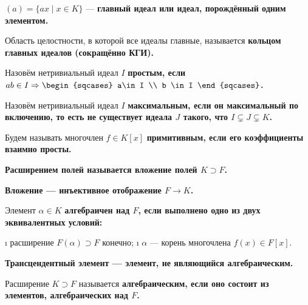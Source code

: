 \begin{defn}
\((a) = \{ax \mid x\in K\}\) --- \bf{главный идеал} или \bf{идеал, порождённый одним элементом}.
\end{defn}

\begin{defn}
Область целостности, в которой все идеалы главные, называется \bf{кольцом главных идеалов} (сокращённо КГИ).
\end{defn}

\begin{defn}
Назовём нетривиальный идеал \(I\) \bf{простым}, если \(ab \in I \Then \begin{sqcases} a\in I \\ b \in I \end{sqcases}\).
\end{defn}

\begin{defn}
Назовём нетривиальный идеал \(I\) \bf{максимальным}, если он максимальный по включению, то есть не существует идеала \(J\) такого, что \(I \subsetneq J \subsetneq K\).
\end{defn}

\begin{defn}
Будем называть многочлен \(f \in K[x]\) \bf{примитивным}, если его коэффициенты взаимно просты.
\end{defn}

\begin{defn}
\bf{Расширением полей} называется вложение полей \(K \supset F\).

\bf{Вложение} --- инъективное отображение \(F \to K\).
\end{defn}

\begin{defn}
Элемент \(\alpha \in K\) \bf{алгебраичен} над \(F\), если выполнено одно из двух эквивалентных условий:

\begin{enumerate}
\def\labelenumi{\arabic{enumi}.}
\tightlist
\i
  расширение \(F(\alpha) \supset F\) конечно;
\i
  \(\alpha\) --- корень многочлена \(f(x) \in F[x]\).
\end{enumerate}

\end{defn}

\begin{defn}
\bf{Трансцендентный элемент} --- элемент, не являющийся алгебраическим.
\end{defn}

\begin{defn}
Расширение \(K \supset F\) называется \bf{алгебраическим}, если оно состоит из элементов, алгебраических над \(F\).
\end{defn}

